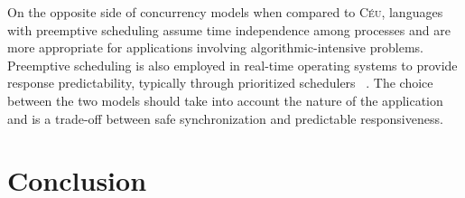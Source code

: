 \documentclass[10pt]{sensys-proc}
\newcommand{\CEU}{\textsc{C\'{e}u}\xspace}
\begin{document}
On the opposite side of concurrency models when compared to \CEU, languages 
with preemptive scheduling assume time independence among processes and are 
more appropriate for applications involving algorithmic-intensive 
problems.
%
Preemptive scheduling is also employed in real-time operating systems to 
provide response predictability, typically through prioritized schedulers
~\cite{wsn.mantisos,wsn.oses,freertos,wsn.tosthreads}.
%
The choice between the two models should take into account the nature of the 
application and is a trade-off between safe synchronization and predictable 
responsiveness.

\section{Conclusion}
\label{sec.conclusion}

%
\end{document}
